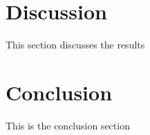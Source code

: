 \documentclass{article}
\begin{document}
\FloatBarrier

\section{Discussion}
This section discusses the results

\section{Conclusion}
This is the conclusion section

\printbibliography
\end{document}
